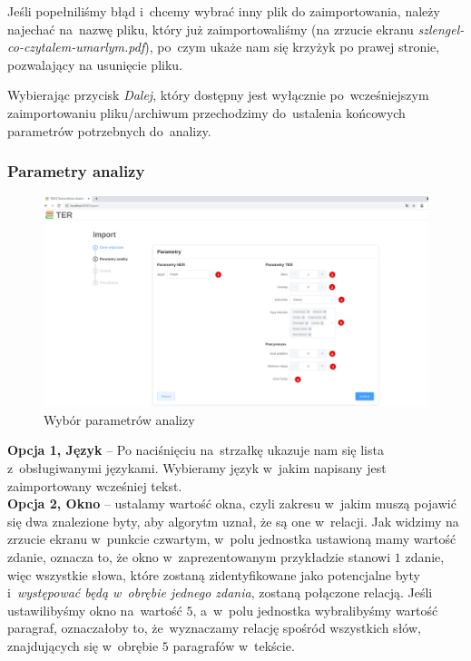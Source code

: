 \documentclass[12pt, a4paper]{article}
\begin{document}
Jeśli popełniliśmy błąd i~chcemy wybrać inny plik do zaimportowania, należy najechać na~nazwę pliku, który już zaimportowaliśmy (na zrzucie ekranu \textit{szlengel-co-czytalem-umarlym.pdf}), po~czym ukaże nam się krzyżyk po prawej stronie, pozwalający na usunięcie pliku.

Wybierając przycisk \textit{Dalej}, który dostępny jest wyłącznie po~wcześniejszym zaimportowaniu pliku/archiwum przechodzimy do~ustalenia końcowych parametrów potrzebnych do~analizy.

\subsubsection{Parametry analizy}\label{parametry-analizy}

\begin{figure}[H]
  \centering
  \includegraphics[width=\linewidth]{images/parameters.png}
  \caption{Wybór parametrów analizy}
\end{figure}

\noindent\textbf{Opcja 1, Język} -- Po naciśnięciu na~strzałkę ukazuje nam się lista z~obsługiwanymi językami. Wybieramy język w~jakim napisany jest zaimportowany wcześniej tekst.\\

\noindent\textbf{Opcja 2, Okno} -- ustalamy wartość okna, czyli zakresu w~jakim muszą pojawić się dwa znalezione byty, aby algorytm uznał, że są one w~relacji. Jak widzimy na zrzucie ekranu w~punkcie czwartym, w~polu jednostka ustawioną mamy wartość zdanie, oznacza to, że okno w~zaprezentowanym przykładzie stanowi $1$ zdanie, więc wszystkie słowa, które zostaną zidentyfikowane jako potencjalne byty i~\textit{występować będą w~obrębie jednego zdania}, zostaną połączone relacją. Jeśli ustawilibyśmy okno na~wartość $5$, a~w~polu jednostka wybralibyśmy wartość paragraf, oznaczałoby to, że~wyznaczamy relację spośród wszystkich słów, znajdujących się w~obrębie $5$ paragrafów w~tekście.\\
\end{document}
